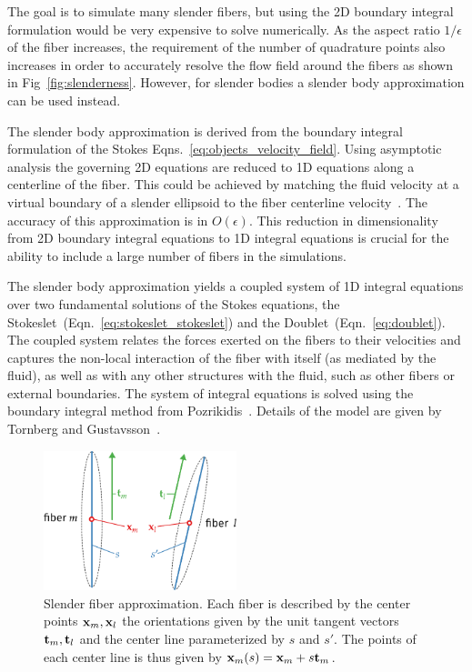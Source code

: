 The goal is to simulate many slender fibers, but using the 2D boundary integral formulation would be very expensive to solve numerically. As the aspect ratio $1/\epsilon$ of the fiber increases, the requirement of the number of quadrature points also increases in order to accurately resolve the flow field around the fibers as shown in Fig~\ref{fig:slenderness}. However, for slender bodies a slender body approximation can be used instead. 

The slender body approximation is derived from the boundary integral formulation of the Stokes Eqns.~\eqref{eq:objects_velocity_field}. Using asymptotic analysis the governing 2D equations are reduced to 1D equations along a centerline of the fiber. This could be achieved by matching the fluid velocity at a virtual boundary of a slender ellipsoid to the fiber centerline velocity~\cite{Gotz2000}. The accuracy of this approximation is in $O(\epsilon).$ This reduction in dimensionality from 2D boundary integral equations to 1D integral equations is crucial for the ability to include a large number of fibers in the simulations.

The slender body approximation yields a coupled system of 1D integral equations over two fundamental solutions of the Stokes equations, the Stokeslet~(Eqn.~\eqref{eq:stokeslet_stokeslet}) and the Doublet~(Eqn.~\eqref{eq:doublet}). The coupled system relates the forces exerted on the fibers to their velocities and captures the non-local interaction of the fiber with itself (as mediated by the fluid), as well as with any other structures with the fluid, such as other fibers or external boundaries. The system of integral equations is solved using the boundary integral method from Pozrikidis~\cite{Pozrikidis1992}. Details of the model are given by Tornberg and Gustavsson~\cite{Tornberg2006}.

\begin{figure}[!htbp]
  \centering
  \includegraphics[width=0.5\textwidth]{img/slender.pdf}
  \caption[Slender fiber approximation.]{Slender fiber approximation. Each fiber is described by the center points $\mathbf{x}_m, \mathbf{x}_l$ the orientations given by the unit tangent vectors $\mathbf{t}_m, \mathbf{t}_l$ and the center line parameterized by $s$ and $s'$. The points of each center line is thus given by $\mathbf{x}_m(s) = \mathbf{x}_m + s\mathbf{t}_m$.}
  \label{fig:slender_fiber}
\end{figure}

